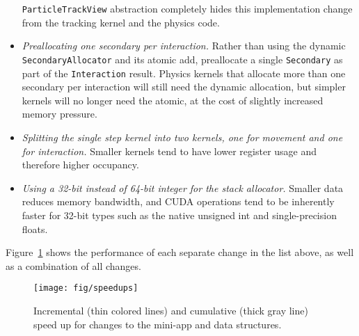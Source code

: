 \documentclass{webofc}
\begin{document}
\begin{itemize}
    \texttt{ParticleTrackView} abstraction completely hides this implementation
    change from the tracking kernel and the physics code.
  \item \emph{Preallocating one secondary per interaction.} Rather than using
    the dynamic \texttt{SecondaryAllocator} and its atomic add, preallocate a
    single \texttt{Secondary} as part of the \texttt{Interaction} result.
    Physics kernels that allocate more than one secondary per interaction will
    still need the dynamic allocation, but simpler kernels will no longer need
    the atomic, at the cost of slightly increased memory pressure.
  \item \emph{Splitting the single step kernel into two kernels, one for movement
    and one for interaction.} Smaller kernels tend to have lower register usage
    and therefore higher occupancy.
  \item \emph{Using a 32-bit instead of 64-bit integer for the stack allocator.}
    Smaller data reduces memory bandwidth, and CUDA operations tend to be
    inherently faster for 32-bit types such as the native unsigned int and
    single-precision floats.
\end{itemize}
Figure~\ref{fig:speedup} shows the performance of each separate change in the
list above, as well as a combination of all changes.

\begin{figure}[htb]
  \centering
  \texttt{[image: fig/speedups]}
  \caption{Incremental (thin colored lines) and cumulative (thick gray line)
  speed up for changes to the mini-app and data structures.}
  \label{fig:speedup}
\end{figure}
\end{document}
